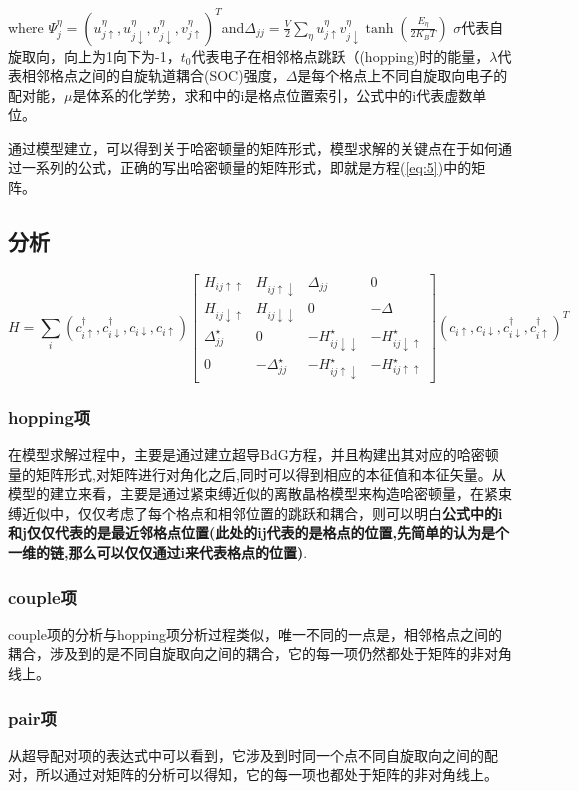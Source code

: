 \documentclass[a4paper,12pt]{ctexart}
\numberwithin{equation}{section}
\begin{document}
where  $\Psi_j^\eta=(u_{j\uparrow}^\eta,u_{j\downarrow}^\eta,v_{j\downarrow}^\eta,v_{j\uparrow}^\eta)^T$and$\Delta_{jj}=\frac{V}{2}\sum_\eta u_{j\uparrow}^\eta v_{j\downarrow}^\eta\tanh(\frac{E_\eta}{2K_BT})$
$\sigma$代表自旋取向，向上为1向下为-1，$t_0$代表电子在相邻格点跳跃（(hopping)时的能量，$\lambda$代表相邻格点之间的自旋轨道耦合(SOC)强度，$\Delta$是每个格点上不同自旋取向电子的配对能，$\mu$是体系的化学势，求和中的i是格点位置索引，公式中的i代表虚数单位。

通过模型建立，可以得到关于哈密顿量的矩阵形式，模型求解的关键点在于如何通过一系列的公式，正确的写出哈密顿量的矩阵形式，即就是方程(\ref{eq:5})中的矩阵。
\subsection{分析}
\begin{equation}
H=\sum_i(c_{i\uparrow}^\dagger,c_{i\downarrow}^\dagger,c_{i\downarrow},c_{i\uparrow}) \left[
\begin{array}{cccc}
H_{ij\uparrow\uparrow}&H_{ij\uparrow\downarrow}&\Delta_{jj}&0\\
H_{ij\downarrow\uparrow}&H_{ij\downarrow\downarrow}&0&-\Delta\\
\Delta_{jj}^\star&0&-H_{ij\downarrow\downarrow}^\star&-H_{ij\downarrow\uparrow}^\star\\
0&-\Delta_{jj}^\star&-H_{ij\uparrow\downarrow}^\star&-H_{ij\uparrow\uparrow}^\star
\end{array}
\right](c_{i\uparrow},c_{i\downarrow},c_{i\downarrow}^\dagger,c_{i\uparrow}^\dagger)^T
\end{equation}\label{eq6}
\subsubsection{hopping项}
在模型求解过程中，主要是通过建立超导BdG方程，并且构建出其对应的哈密顿量的矩阵形式,对矩阵进行对角化之后,同时可以得到相应的本征值和本征矢量。从模型的建立来看，主要是通过紧束缚近似的离散晶格模型来构造哈密顿量，在紧束缚近似中，仅仅考虑了每个格点和相邻位置的跳跃和耦合，则可以明白\textbf{公式中的i和j仅仅代表的是最近邻格点位置(此处的ij代表的是格点的位置,先简单的认为是个一维的链,那么可以仅仅通过i来代表格点的位置)}.
\subsubsection{couple项}
couple项的分析与hopping项分析过程类似，唯一不同的一点是，相邻格点之间的耦合，涉及到的是不同自旋取向之间的耦合，它的每一项仍然都处于矩阵的非对角线上。
\subsubsection{pair项}
从超导配对项的表达式中可以看到，它涉及到时同一个点不同自旋取向之间的配对，所以通过对矩阵的分析可以得知，它的每一项也都处于矩阵的非对角线上。
\end{document}
